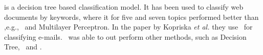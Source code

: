 \rf is a decision tree based classification model. It has been used to classify web documents by keywords, where it for five and seven topics performed better than ,e.g., \nb\ and Multilayer Perceptron. In the paper by Kopriska \emph{et al.} they use \rf\ for classifying e-mails. \rf\ was able to out perform other methods, such as Decision Tree, \svm\ and \nb. \cite{keywords}\cite{email}